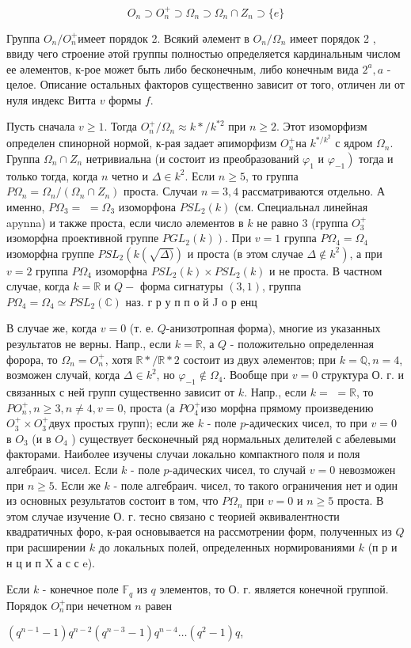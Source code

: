 \documentclass[10pt]{article}
\begin{document}
\[
O_{n} \supset O_{n}^{+} \supset \Omega_{n} \supset \Omega_{n} \cap Z_{n} \supset\{e\}
\]

Группа $O_{n} / O_{n}^{+}$имеет порядок 2. Всякий әлемент в $O_{n} / \Omega_{n}$ имеет порядок 2 , ввиду чего строение әтой группы полностью определяется кардинальным числом ее әлементов, к-рое может быть либо бесконечным, либо конечным вида $2^{a}, a$ - целое. Описание остальных факторов существенно зависит от того, отличен ли от нуля индекс Витта $v$ формы $f$.

Пусть сначала $v \geqslant 1$. Тогда $O_{n}^{+} / \Omega_{n} \approx k * / k^{* 2}$ при $n \geqslant 2$. Этот изоморфизм определен спинорной нормой, к-рая задает әпиморфизм $O_{n}^{+}$на $k^{* / k^{2}}$ с ядром $\Omega_{n}$. Группа $\Omega_{n} \cap Z_{n}$ нетривиальна (и состоит из преобразований $\varphi_{1}$ и $\left.\varphi_{-1}\right)$ тогда и только тогда, когда $n$ четно и $\Delta \in k^{2}$. Если $n \geqslant 5$, то группа $P \Omega_{n}=\Omega_{n} /\left(\Omega_{n} \cap Z_{n}\right)$ проста. Случаи $n=3,4$ рассматриваются отдельно. А именно, $P \Omega_{3}=$ $=\Omega_{3}$ изоморфона $P S L_{2}(k)$ (см. Специальнал линейная apynna) и также проста, если число әлементов в $k$ не равно 3 (группа $O_{3}^{+}$изоморфна проективной группе $\left.P G L_{2}(k)\right)$. При $v=1$ группа $P \Omega_{4}=\Omega_{4}$ изоморфна группе $P S L_{2}\left(k(\sqrt{\Delta)})\right.$ и проста (в этом случае $\left.\Delta \notin k^{2}\right)$, а при $v=2$ группа $P \Omega_{4}$ изоморфна $P S L_{2}(k) \times P S L_{2}(k)$ и не проста. В частном случае, когда $k=\mathbb{R}$ и $Q-$ форма сигнатуры $(3,1)$, группа $P \Omega_{4}=\Omega_{4} \simeq P S L_{2}(\mathbb{C})$ наз. г р у п п о й J о р енц

В случае же, когда $v=0$ (т. е. $Q$-анизотропная форма), многие из указанных результатов не верны. Напр., если $k=\mathbb{R}$, а $Q$ - положительно определенная форора, то $\Omega_{n}=O_{n}^{+}$, хотя $\mathbb{R} * / \mathbb{R} * 2$ состоит из двух әлементов; при $k=\mathbb{Q}, n=4$, возможен случай, когда $\Delta \in k^{2}$, но $\varphi_{-1} \notin \Omega_{4}$. Вообще при $v=0$ структура О. г. и связанных с ней групп существенно зависит от $k$. Напр., если $k=$ $=\mathbb{R}$, то $P O_{n}^{+}, n \geqslant 3, n \neq 4, v=0$, проста (а $P O_{4}^{+}$изо морфна прямому произведению $O_{3}^{+} \times O_{3}^{+}$двух простых групп); если же $k$ - поле $p$-адических чисел, то при $v=0$ в $O_{3}$ (и в $O_{4}$ ) существует бесконечный ряд нормальных делителей с абелевыми факторами. Наиболее изучены случаи локально компактного поля и поля алгебраич. чисел. Если $k$ - поле $p$-адических чисел, то случай $v=0$ невозможен при $n \geqslant 5$. Если же $k$ - поле алгебраич. чисел, то такого ограничения нет и один из основных результатов состоит в том, что $P \Omega_{n}$ при $v=0$ и $n \geqslant 5$ проста. В этом случае изучение О. г. тесно связано с теорией әквивалентности квадратичных форо, к-рая основывается на рассмотрении форм, полученных из $Q$ при расширении $k$ до локальных полей, определенных нормированиями $k$ (п р и н ц и п $\mathrm{X}$ а с с e).

Если $k$ - конечное поле $\mathbb{F}_{q}$ из $q$ элементов, то О. г. является конечной группой. Порядок $O_{n}^{+}$при нечетном $n$ равен

$\left(q^{n-1}-1\right) q^{n-2}\left(q^{n-3}-1\right) q^{n-4} \ldots\left(q^{2}-1\right) q$,
\end{document}
